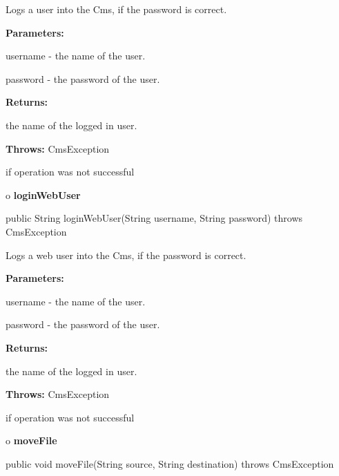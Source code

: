 \begin{description}
\htmlDD Logs a user into the Cms, if the password is correct. 

\begin{description}
\item {\bf Parameters:}  

username - the name of the user.  

password - the password of the user.  
\item {\bf Returns:}  

the name of the logged in user.  
\item {\bf Throws:} CmsException  

if operation was not successful  
\end{description}

\end{description}

o {\bf loginWebUser} 

\begin{PRE}
 public String loginWebUser(String username,
                            String password) throws CmsException
\end{PRE}

\begin{description}
\htmlDD Logs a web user into the Cms, if the password is correct. 

\begin{description}
\item {\bf Parameters:}  

username - the name of the user.  

password - the password of the user.  
\item {\bf Returns:}  

the name of the logged in user.  
\item {\bf Throws:} CmsException  

if operation was not successful  
\end{description}

\end{description}

o {\bf moveFile} 

\begin{PRE}
 public void moveFile(String source,
                      String destination) throws CmsException
\end{PRE}

